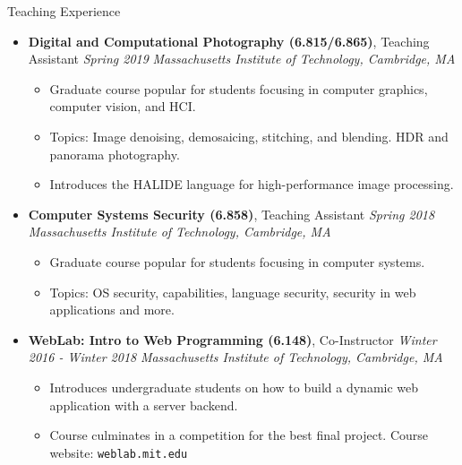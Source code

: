 \documentclass[10pt]{article}
\begin{document}
\begin{area}{Teaching Experience}
\begin{itemize}
    \item
        \textbf{Digital and Computational Photography (6.815/6.865)}, Teaching Assistant \hfill \emph{Spring 2019} \linebreak
        \emph{Massachusetts Institute of Technology, Cambridge, MA}
        \begin{itemize}
            \item Graduate course popular for students focusing in computer graphics, computer vision, and HCI.
            \item Topics: Image denoising, demosaicing, stitching, and blending. HDR and panorama photography.
            \item Introduces the HALIDE language for high-performance image processing.
        \end{itemize}
    \item
        \textbf{Computer Systems Security (6.858)}, Teaching Assistant \hfill \emph{Spring 2018} \linebreak
        \emph{Massachusetts Institute of Technology, Cambridge, MA}
        \begin{itemize}
            \item Graduate course popular for students focusing in computer systems.
            \item Topics: OS security, capabilities, language security, security in web applications and more.
        \end{itemize}
    \item
        \textbf{WebLab: Intro to Web Programming (6.148)}, Co-Instructor \hfill \emph{Winter 2016 - Winter 2018} \linebreak
        \emph{Massachusetts Institute of Technology, Cambridge, MA}
        \begin{itemize}
            \item Introduces undergraduate students on how to build a dynamic web application with a server backend.
            \item Course culminates in a competition for the best final project. Course website: \texttt{weblab.mit.edu}
        \end{itemize}
\end{itemize}
\end{area}
\end{document}
